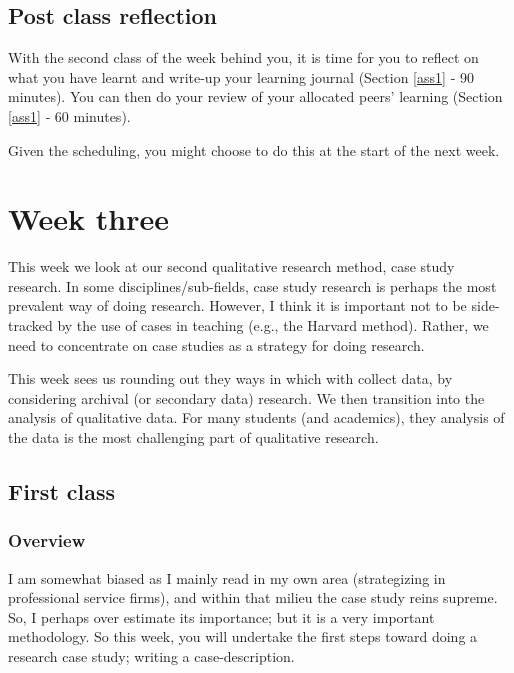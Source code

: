 \documentclass[]{book}
\theoremstyle{definition}
\theoremstyle{definition}
\theoremstyle{definition}
\theoremstyle{remark}
\begin{document}
\hypertarget{post-class-reflection-3}{%
\section*{Post class reflection}\label{post-class-reflection-3}}

With the second class of the week behind you, it is time for you to
reflect on what you have learnt and write-up your learning journal
(Section \ref{ass1} ‐ 90 minutes). You can then do your review of your
allocated peers' learning (Section \ref{ass1} ‐ 60 minutes).

Given the scheduling, you might choose to do this at the start of the
next week.

\hypertarget{w3-details}{%
\chapter{Week three}\label{w3-details}}

This week we look at our second qualitative research method, case study
research. In some disciplines/sub-fields, case study research is perhaps
the most prevalent way of doing research. However, I think it is
important not to be side-tracked by the use of cases in teaching (e.g.,
the Harvard method). Rather, we need to concentrate on case studies as a
strategy for doing research.

This week sees us rounding out they ways in which with collect data, by
considering archival (or secondary data) research. We then transition
into the analysis of qualitative data. For many students (and
academics), they analysis of the data is the most challenging part of
qualitative research.

\hypertarget{first-class-2}{%
\section*{First class}\label{first-class-2}}

\hypertarget{overview-4}{%
\subsection*{Overview}\label{overview-4}}

I am somewhat biased as I mainly read in my own area (strategizing in
professional service firms), and within that milieu the case study reins
supreme. So, I perhaps over estimate its importance; but it is a very
important methodology. So this week, you will undertake the first steps
toward doing a research case study; writing a case-description.
\end{document}
